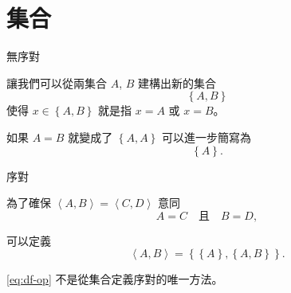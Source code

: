 \documentclass{Slideshow}
\begin{document}
\section{集合}

\begin{frame}{無序對}
    \begin{definition}
        \newcommand{\thepair}{\left\{ A, B \right\}}
        讓我們可以從兩集合 $A$, $B$ 建構出新的集合
        \[ \thepair \]
        使得 $x \in \thepair$ 就是指 $x = A$ 或 $x = B$。
    \end{definition}

    如果 $A = B$ 就變成了 $\left\{ A, A \right\}$ 可以進一步簡寫為
    \[ \left\{ A \right\}.\]
\end{frame}

\begin{frame}{序對}
    \begin{definition}
        為了確保 $\left\langle A, B \right\rangle = \left\langle C, D \right\rangle$ 意同
        \[ A = C \quad \mbox{且} \quad B = D,\]

        可以定義
        \begin{equation}
            \left\langle A, B \right\rangle =
            \left\{ \left\{ A \right\}, \left\{ A, B \right\} \right\}.
            \label{eq:df-op}
        \end{equation}
    \end{definition}

    \eqref{eq:df-op} 不是從集合定義序對的唯一方法。
\end{frame}
\end{document}
